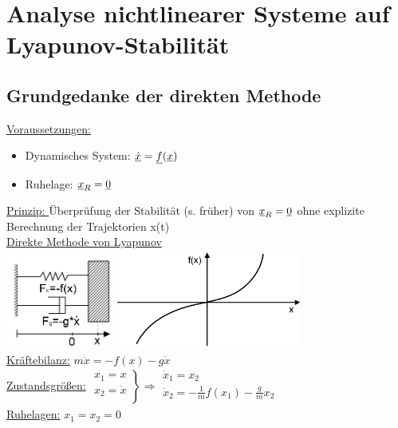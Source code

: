 \documentclass[openany,a4paper,11pt]{book}
\begin{document}
\chapter[Lyapunov-Stabilität]{Analyse nichtlinearer Systeme auf Lyapunov-Stabilität}
\section[direkte Methode]{Grundgedanke der direkten Methode}
\uline{Voraussetzungen: } \begin{itemize}
    \item Dynamisches System: $\uline{\dot{x}}=\uline{f}(\uline{x})$
    \item Ruhelage: $\uline{x}_R=\uline{0}$
\end{itemize}
\uline{Prinzip: } Überprüfung der Stabilität (s. früher) von $\uline{x}_R=\uline{0}$ ohne explizite Berechnung der Trajektorien x(t)\\
\uline{Direkte Methode von Lyapunov}\\
\includegraphics[width=1.4in]{imgs/NLR34.png}  \includegraphics[width=2.4in]{imgs/NLR35.png}\\
\uline{Kräftebilanz:} $m\ddot{x}=-f(x)-g\dot{x}$\\
\uline{Zustandsgrößen:} $\left. \begin{array}{r}
    x_1=x\\
    x_2=\dot{x}\\
    \end{array}
    \right\} \Rightarrow 
    \begin{array}{l}
    \dot{x}_1=x_2\\
    \dot{x}_2=-\frac{1}{m}f(x_1)-\frac{g}{m}x_2\\
    \end{array}$\\
\uline{Ruhelagen:} $x_1=x_2=0$\\
\end{document}

